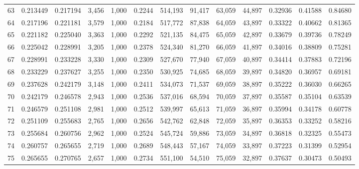 \begin{tabular}{rrrrrrrrrrrrr}
63  &  0.213449 &  0.217194 &   3,456 &  1,000 &                                     0.2244 &  514,193 &   91,417 &   63,059 &   44,897 &  0.32936 &  0.41588 &  0.84680 \\
64  &  0.217196 &  0.221181 &   3,579 &  1,000 &                                     0.2184 &  517,772 &   87,838 &   64,059 &   43,897 &  0.33322 &  0.40662 &  0.81365 \\
65  &  0.221182 &  0.225040 &   3,363 &  1,000 &                                     0.2292 &  521,135 &   84,475 &   65,059 &   42,897 &  0.33679 &  0.39736 &  0.78249 \\
66  &  0.225042 &  0.228991 &   3,205 &  1,000 &                                     0.2378 &  524,340 &   81,270 &   66,059 &   41,897 &  0.34016 &  0.38809 &  0.75281 \\
67  &  0.228991 &  0.233228 &   3,330 &  1,000 &                                     0.2309 &  527,670 &   77,940 &   67,059 &   40,897 &  0.34414 &  0.37883 &  0.72196 \\
68  &  0.233229 &  0.237627 &   3,255 &  1,000 &                                     0.2350 &  530,925 &   74,685 &   68,059 &   39,897 &  0.34820 &  0.36957 &  0.69181 \\
69  &  0.237628 &  0.242179 &   3,148 &  1,000 &                                     0.2411 &  534,073 &   71,537 &   69,059 &   38,897 &  0.35222 &  0.36030 &  0.66265 \\
70  &  0.242179 &  0.246578 &   2,943 &  1,000 &                                     0.2536 &  537,016 &   68,594 &   70,059 &   37,897 &  0.35587 &  0.35104 &  0.63539 \\
71  &  0.246579 &  0.251108 &   2,981 &  1,000 &                                     0.2512 &  539,997 &   65,613 &   71,059 &   36,897 &  0.35994 &  0.34178 &  0.60778 \\
72  &  0.251109 &  0.255683 &   2,765 &  1,000 &                                     0.2656 &  542,762 &   62,848 &   72,059 &   35,897 &  0.36353 &  0.33252 &  0.58216 \\
73  &  0.255684 &  0.260756 &   2,962 &  1,000 &                                     0.2524 &  545,724 &   59,886 &   73,059 &   34,897 &  0.36818 &  0.32325 &  0.55473 \\
74  &  0.260757 &  0.265655 &   2,719 &  1,000 &                                     0.2689 &  548,443 &   57,167 &   74,059 &   33,897 &  0.37223 &  0.31399 &  0.52954 \\
75  &  0.265655 &  0.270765 &   2,657 &  1,000 &                                     0.2734 &  551,100 &   54,510 &   75,059 &   32,897 &  0.37637 &  0.30473 &  0.50493 \\

\end{tabular}
